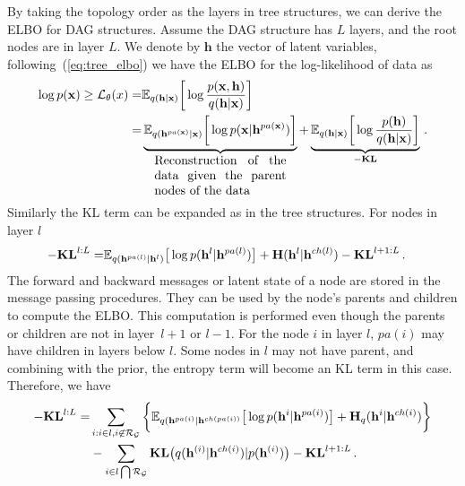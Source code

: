 \documentclass[twoside]{article}
\begin{document}
By taking the topology order as the layers in tree structures, we can derive the ELBO for DAG structures.  
Assume the DAG structure has $L$ layers, and the root nodes are in layer $L$. 
We denote by $\mathbf{h}$ the vector of latent variables, following~(\ref{eq:tree_elbo}) we have the ELBO for the log-likelihood of  data as
\begin{align}  \label{eq:dag_elbo}
\log p(\mathbf{x})  \geq  \mathcal{L}_{\theta}(x)  = &  \mathbb{E}_{q(\mathbf{h} | \mathbf{x})} \bigg[ \log  \frac{p(\mathbf{x}, \mathbf{h})}{q(\mathbf{h}|\mathbf{x})}  \bigg]  \\ \notag
=&  \underbrace{ \mathbb{E}_{q(\mathbf{h}^{pa(\mathbf{x})} | \mathbf{x})} \bigg[ \log  p(\mathbf{x} | \mathbf{h}^{pa(\mathbf{x})})  \bigg] }_{  \parbox{10.5em}{Reconstruction of the data given the parent nodes of the data}}  +  \underbrace{  \mathbb{E}_{q(\mathbf{h}| \mathbf{x})} \bigg[ \log  \frac{p( \mathbf{h})}{q(\mathbf{h}|\mathbf{x})}  \bigg] }_{-\textbf{\text{KL}}} \, .   \notag
\end{align}
Similarly the KL term can be expanded as in the tree structures. 
For nodes in layer $l$
\begin{align} \label{eq:KL_dag1}
-\textbf{\text{KL}}^{l:L} 
=&     \mathbb{E}_{q(\mathbf{h}^{pa(l)}|\mathbf{h}^l)} \big[ \log  p( \mathbf{h}^{l}|  \mathbf{h}^{pa(l)})    \big]  +  \textbf{\text{H}}(\mathbf{h}^{l}|\mathbf{h}^{ch(l)})  - \textbf{\text{KL}}^{l+1:L} \, .
\end{align}
The forward and backward messages or latent state of a node are stored in the message passing procedures. They can be used by the node's parents and children  to compute the ELBO.  
This computation is performed even though the parents or children are not  in layer~$l+1$ or $l-1$. 
For the node $i$ in layer $l$,  $pa(i)$ may have children in layers below $l$. Some nodes in $l$ may not have parent, and combining with the prior, the entropy term will become an KL term in this case.  
Therefore,  we have 
\begin{align} \label{eq:KL_dag2}
-\textbf{\text{KL}}^{l:L} = &  \sum_{i:i\in l, i \not\in   \mathcal{R}_{ \mathcal{G}} }  \bigg\{ \mathbb{E}_{q(\mathbf{h}^{pa(i)}|\mathbf{h}^{ch(pa(i))}} \big[ \log p( \mathbf{h}^{i}|  \mathbf{h}^{pa(i)})    \big]   +  \textbf{\text{H}}_q(\mathbf{h}^{i}|\mathbf{h}^{ch(i)})  \bigg\}  \\ \notag
& -  \sum_{i \in l \bigcap \mathcal{R}_{ \mathcal{G} }  }  \textbf{\text{KL}}\big(q(\mathbf{h}^{(i)} | \mathbf{h}^{ch(i)} )   | p(\mathbf{h}^{(i)})  \big)  - \textbf{\text{KL}}^{l+1:L} \, .\notag
\end{align}
\end{document}
